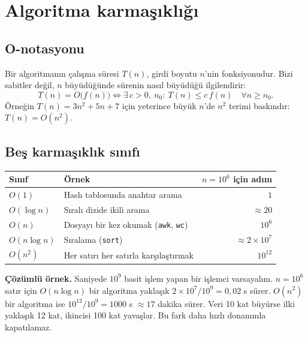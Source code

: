 \documentclass[11pt,a4paper]{article}
\begin{document}
\section{Algoritma karmaşıklığı}

\subsection{O-notasyonu}
Bir algoritmanın çalışma süresi $T(n)$, girdi boyutu $n$'nin fonksiyonudur. Bizi sabitler değil, $n$ büyüdüğünde sürenin nasıl büyüdüğü ilgilendirir:
\begin{equation}
T(n) = O\big(f(n)\big) \iff \exists\, c>0,\ n_0 :\ T(n) \le c\, f(n)\quad \forall n \ge n_0 .
\end{equation}
Örneğin $T(n) = 3n^{2} + 5n + 7$ için yeterince büyük $n$'de $n^{2}$ terimi baskındır: $T(n) = O(n^{2})$.

\subsection{Beş karmaşıklık sınıfı}
\begin{center}
\begin{tabularx}{\textwidth}{@{}l Y r@{}}
\toprule
\textbf{Sınıf} & \textbf{Örnek} & \textbf{$n=10^{6}$ için adım} \\
\midrule
$O(1)$ & Hash tablosunda anahtar arama & $1$ \\
$O(\log n)$ & Sıralı dizide ikili arama & $\approx 20$ \\
$O(n)$ & Dosyayı bir kez okumak (\texttt{awk}, \texttt{wc}) & $10^{6}$ \\
$O(n \log n)$ & Sıralama (\texttt{sort}) & $\approx 2\times10^{7}$ \\
$O(n^{2})$ & Her satırı her satırla karşılaştırmak & $10^{12}$ \\
\bottomrule
\end{tabularx}
\end{center}
\begin{kutu}
\textbf{Çözümlü örnek.} Saniyede $10^{9}$ basit işlem yapan bir işlemci varsayalım. $n = 10^{6}$ satır için $O(n\log n)$ bir algoritma yaklaşık $2\times10^{7}/10^{9} = 0{,}02$ s sürer. $O(n^{2})$ bir algoritma ise $10^{12}/10^{9} = 1000$ s $\approx 17$ dakika sürer. Veri 10 kat büyürse ilki yaklaşık 12 kat, ikincisi 100 kat yavaşlar. Bu fark daha hızlı donanımla kapatılamaz.
\end{kutu}
\end{document}
